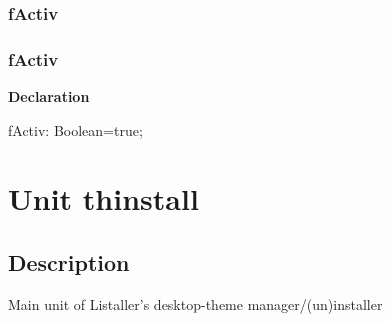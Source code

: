 \documentclass{report}
\newif\ifpdf
\begin{document}
\subsection*{\large{\textbf{fActiv}}\normalsize\hspace{1ex}\hrulefill}
\else
\subsection*{fActiv}
\fi
\label{swcatalog-fActiv}
\begin{list}{}{
\setlength{\itemindent}{0cm}
\setlength{\listparindent}{0cm}
\setlength{\leftmargin}{\evensidemargin}
\addtolength{\leftmargin}{\tmplength}
\settowidth{\labelsep}{X}
\addtolength{\leftmargin}{\labelsep}
\setlength{\labelwidth}{\tmplength}
}
\item[\textbf{Declaration}\hfill]
\ifpdf
\begin{flushleft}
\fi
\begin{ttfamily}
fActiv: Boolean=true;\end{ttfamily}

\ifpdf
\end{flushleft}
\fi

\end{list}
\chapter{Unit thinstall}
\label{thinstall}
\section{Description}
Main unit of Listaller's desktop{-}theme manager/(un)installer
\end{document}
